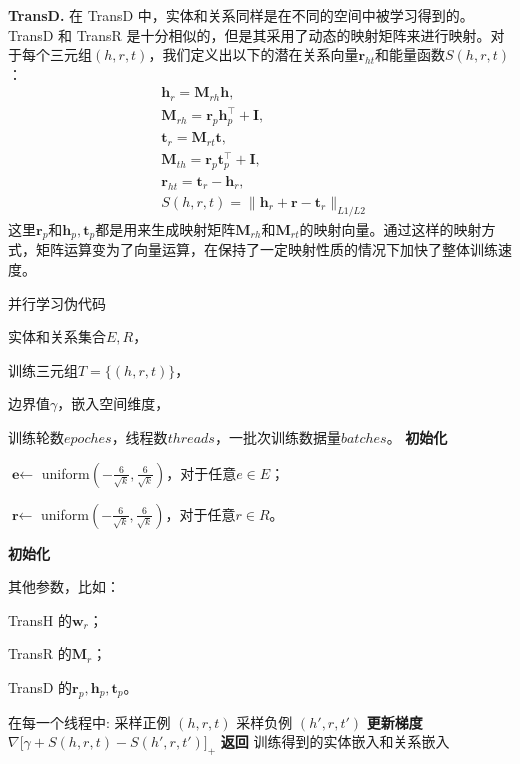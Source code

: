 \textbf{TransD.} 在 TransD 中，实体和关系同样是在不同的空间中被学习得到的。TransD 和 TransR 是十分相似的，但是其采用了动态的映射矩阵来进行映射。对于每个三元组$(h, r, t)$，我们定义出以下的潜在关系向量$\textbf{r}_{ht}$和能量函数$S(h,r,t)$：
\begin{align}
&\textbf{h}_{r} = \textbf{M}_{rh}\textbf{h}, \\\nonumber
&\textbf{M}_{rh} = \textbf{r}_p\textbf{h}_p^{\top}+\textbf{I}, \\\nonumber
&\textbf{t}_{r} = \textbf{M}_{rt}\textbf{t},  \\\nonumber
&\textbf{M}_{th} = \textbf{r}_p\textbf{t}_p^{\top}+\textbf{I}, \\\nonumber
&\textbf{r}_{ht} = \textbf{t}_r - \textbf{h}_r,  \\\nonumber
& S(h, r, t) = \lVert \textbf{h}_r + \textbf{r} - \textbf{t}_r \rVert_{L1/L2}
\end{align}
这里$\textbf{r}_p$和$\textbf{h}_p, \textbf{t}_p$都是用来生成映射矩阵$\textbf{M}_{rh}$和$\textbf{M}_{rt}$的映射向量。通过这样的映射方式，矩阵运算变为了向量运算，在保持了一定映射性质的情况下加快了整体训练速度。


\begin{algorithm}[t]
  \caption{并行学习伪代码}
  \label{algo1}
  \begin{algorithmic}[1]
        \Require 

        实体和关系集合$E, R$，

        训练三元组$T = \{(h, r, t)\}$，

        边界值$\gamma$，嵌入空间维度，

        训练轮数$epoches$，线程数$threads$，一批次训练数据量$batches$。
        \State \textbf{初始化} 

        $\textbf{e} \leftarrow $ uniform$ ( -\frac{6}{\sqrt{k}}, \frac{6}{\sqrt{k}}) $，对于任意$e \in E$；

        $\textbf{r} \leftarrow $ uniform$ ( -\frac{6}{\sqrt{k}}, \frac{6}{\sqrt{k}}) $，对于任意$r \in R$。

    \State \textbf{初始化}

    其他参数，比如：

    TransH 的$\textbf{w}_r$；

    TransR 的$\textbf{M}_r$；

    TransD 的$\textbf{r}_p, \textbf{h}_p, \textbf{t}_p$。
    
      \State 在每一个线程中:
      \State 采样正例 $(h, r, t)$
      \State 采样负例 $(h', r, t')$
      \State \textbf{更新梯度} $\nabla \big[ \gamma + S(h,r,t) - S(h', r, t') \big]_{+}$
      \EndIf
      \EndFor
      \EndFor
    \State \textbf{返回} 训练得到的实体嵌入和关系嵌入
  \end{algorithmic}
\end{algorithm}

